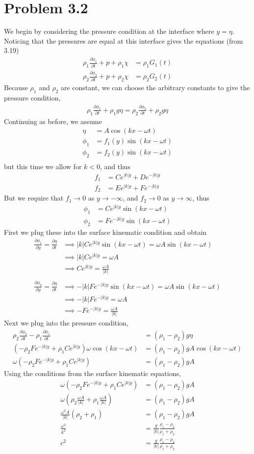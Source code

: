 \documentclass[12pt]{article}
\newcommand{\eq}[1]{\begin{align*}#1\end{align*}}
\newcommand{\p}[2]{\frac{\partial#1}{\partial#2}}
\begin{document}
\section*{Problem 3.2} We begin by considering the pressure condition at the interface where $y = \eta$. Noticing that the pressures are equal at this interface gives the equations (from 3.19)
\eq{
	\rho_1\p{\phi_1}{t} + p + \rho_1\chi &= \rho_1G_1(t)\\
	\rho_2\p{\phi_2}{t} + p + \rho_2\chi &= \rho_2G_2(t)
}
Because $\rho_1$ and $\rho_2$ are constant, we can choose the arbitrary constants to give the pressure condition,
\eq{
	\rho_1\p{\phi_1}{t} + \rho_1g\eta = \rho_2\p{\phi_2}{t} + \rho_2g\eta
}
Continuing as before, we assume
\eq{
	\eta &= A\cos(kx - \omega t)\\
	\phi_1 &= f_1(y)\sin(kx - \omega t)\\
	\phi_2 &= f_2(y)\sin(kx - \omega t)\\
}
but this time we allow for $k < 0$, and thus
\eq{
	f_1 &= Ce^{|k|y} + De^{-|k|y}\\
	f_2 &= Ee^{|k|y} + Fe^{-|k|y}
}
But we require that $f_1 \rightarrow 0$ as $y \rightarrow -\infty$, and $f_2 \rightarrow 0$ as $y \rightarrow \infty$, thus
\eq{
	\phi_1 &= Ce^{|k|y}\sin(kx - \omega t)\\
	\phi_2 &= Fe^{-|k|y}\sin(kx - \omega t)
}
First we plug these into the surface kinematic condition and obtain
\eq{
	\p{\phi_1}{y} = \p{\eta}{t} &\implies |k|Ce^{|k|y}\sin(kx - \omega t) = \omega A\sin(kx - \omega t)\\
	&\implies |k|Ce^{|k|y} = \omega A\\
	&\implies Ce^{|k|y} = \frac{\omega A}{|k|}\\
	\\
	\p{\phi_2}{y} = \p{\eta}{t} &\implies -|k|Fe^{-|k|y}\sin(kx - \omega t) = \omega A\sin(kx - \omega t)\\
	&\implies -|k|Fe^{-|k|y} = \omega A\\
	&\implies -Fe^{-|k|y} = \frac{\omega A}{|k|}
}
Next we plug into the pressure condition,
\eq{
	\rho_2\p{\phi_2}{t} - \rho_1\p{\phi_1}{t} &= (\rho_1 - \rho_2)g\eta\\
	(-\rho_2 Fe^{-|k|y} + \rho_1Ce^{|k|y})\omega \cos(kx - \omega t) &= (\rho_1 - \rho_2)gA\cos(kx - \omega t)\\
	\omega(-\rho_2 Fe^{-|k|y} + \rho_1Ce^{|k|y}) &= (\rho_1 - \rho_2)gA
}
Using the conditions from the surface kinematic equations,
\eq{
	\omega(-\rho_2 Fe^{-|k|y} + \rho_1Ce^{|k|y}) &= (\rho_1 - \rho_2)gA\\
	\omega(\rho_2 \frac{\omega A}{|k|} + \rho_1 \frac{\omega A}{|k|}) &= (\rho_1 - \rho_2)gA\\
	\frac{\omega^2 A}{|k|}(\rho_2 + \rho_1) &= (\rho_1 - \rho_2)gA\\
	\frac{\omega^2}{k^2} &= \frac{g}{|k|}\frac{\rho_1 - \rho_2}{\rho_1 + \rho_2}\\
	c^2 &= \frac{g}{|k|}\frac{\rho_1 - \rho_2}{\rho_1 + \rho_2}
}
\end{document}

